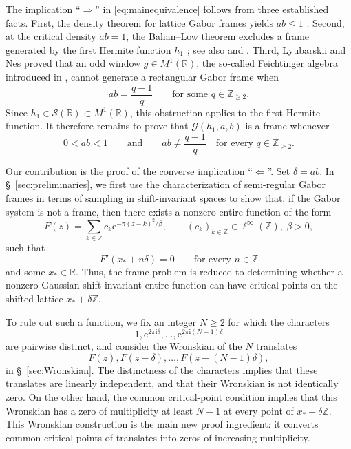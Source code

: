 \documentclass[11pt]{amsart}
\numberwithin{equation}{section}
\theoremstyle{definition}
\theoremstyle{remark}
\newcommand{\R}{\mathbb R}
\newcommand{\Z}{\mathbb Z}
\newcommand{\ii}{\mathrm i}
\newcommand{\e}{\mathrm e}
\begin{document}
The implication ``$\Longrightarrow$'' in \eqref{eq:mainequivalence} follows from three established facts. First, the density theorem for lattice Gabor frames yields $ab\leq 1$ \cite{GroechenigBook,HeilDensity}. Second, at the critical density $ab=1$, the Balian--Low theorem excludes a frame generated by the first Hermite function $h_1$ \cite{Balian,Low}; see also \cite{BHW} and \cite[Chap.~8]{GroechenigBook}. Third, Lyubarskii and Nes \cite{LN} proved that an odd window $g\in M^1(\R)$, the so-called Feichtinger algebra introduced in \cite{Fei81}, cannot generate a rectangular Gabor frame when
\begin{equation}
    ab=\frac{q-1}{q} \qquad \text{for some } q\in\Z_{\geq 2}.
\end{equation}
Since $h_1\in\mathcal S(\R)\subset M^1(\R)$, this obstruction applies to the first Hermite function. It therefore remains to prove that $\mathcal G(h_1,a,b)$ is a frame whenever
\begin{equation}
    0<ab<1 \qquad\text{and}\qquad ab\neq\frac{q-1}{q} \quad\text{for every }q\in\Z_{\geq 2}.
\end{equation}

Our contribution is the proof of the converse implication ``$\Longleftarrow$''. Set $\delta=ab$. In \S~\ref{sec:preliminaries}, we first use the characterization of semi-regular Gabor frames in terms of sampling in shift-invariant spaces \cite{GRSsampling} to show that, if the Gabor system is not a frame, then there exists a nonzero entire function of the form
\begin{equation}
    F(z)=\sum_{k\in\Z}c_k \e^{-\pi(z-k)^2/\beta}, \qquad (c_k)_{k\in\Z}\in\ell^\infty(\Z), \ \beta > 0,
\end{equation}
such that
\begin{equation}
    F'(x_*+n\delta)=0 \qquad\text{for every }n\in\Z
\end{equation}
and some $x_*\in\R$. Thus, the frame problem is reduced to determining whether a nonzero Gaussian shift-invariant entire function can have critical points on the shifted lattice $x_*+\delta \Z$.

To rule out such a function, we fix an integer $N\geq 2$ for which the characters
\begin{equation}
    1,\e^{2\pi\ii\delta},\ldots,\e^{2\pi\ii(N-1)\delta}
\end{equation} 
are pairwise distinct, and consider the Wronskian of the $N$ translates
\begin{equation}
    F(z),F(z-\delta),\ldots,F(z-(N-1)\delta),
\end{equation}
in \S~\ref{sec:Wronskian}. The distinctness of the characters implies that these translates are linearly independent, and that their Wronskian is not identically zero. On the other hand, the common critical-point condition implies that this Wronskian has a zero of multiplicity at least $N-1$ at every point of $x_*+\delta\Z$. This Wronskian construction is the main new proof ingredient: it converts common critical points of translates into zeros of increasing multiplicity.
\end{document}
